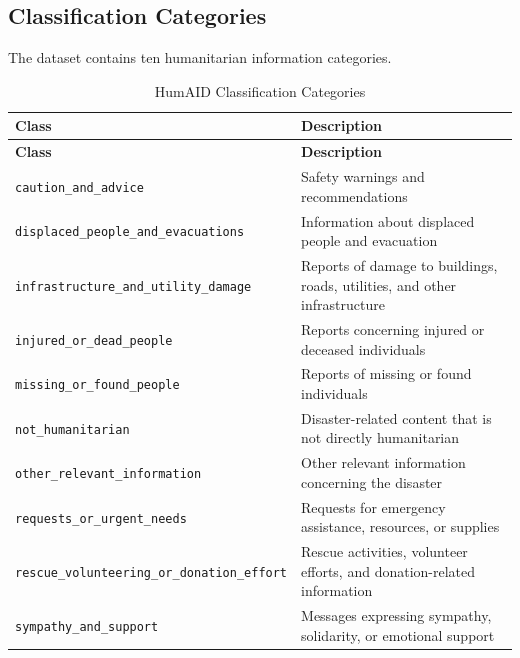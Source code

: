 \documentclass[12pt,a4paper]{article}
\begin{document}
\subsection{Classification Categories}

The dataset contains ten humanitarian information categories.

\begin{longtable}{p{}p{}}
\caption{HumAID Classification Categories} \\
\toprule
\textbf{Class} & \textbf{Description} \\
\midrule
\endfirsthead

\toprule
\textbf{Class} & \textbf{Description} \\
\midrule
\endhead

\texttt{caution\_and\_advice}
&
Safety warnings and recommendations
\\

\texttt{displaced\_people\_and\_evacuations}
&
Information about displaced people and evacuation
\\

\texttt{infrastructure\_and\_utility\_damage}
&
Reports of damage to buildings, roads, utilities, and other infrastructure
\\

\texttt{injured\_or\_dead\_people}
&
Reports concerning injured or deceased individuals
\\

\texttt{missing\_or\_found\_people}
&
Reports of missing or found individuals
\\

\texttt{not\_humanitarian}
&
Disaster-related content that is not directly humanitarian
\\

\texttt{other\_relevant\_information}
&
Other relevant information concerning the disaster
\\

\texttt{requests\_or\_urgent\_needs}
&
Requests for emergency assistance, resources, or supplies
\\

\texttt{rescue\_volunteering\_or\_donation\_effort}
&
Rescue activities, volunteer efforts, and donation-related information
\\

\texttt{sympathy\_and\_support}
&
Messages expressing sympathy, solidarity, or emotional support
\\

\bottomrule
\end{longtable}
\end{document}

